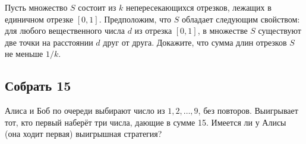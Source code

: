 Пусть множество $S$ состоит из $k$ непересекающихся отрезков, лежащих в единичном отрезке $[0,1]$.
Предположим, что $S$ обладает следующим свойством: для любого вещественного числа $d$ из отрезка $[0,1]$, в множестве $S$ существуют две точки на расстоянии $d$ друг от друга.
Докажите, что сумма длин отрезков $S$ не меньше $1/k$.

 
\subsection*{Собрать 15} %

Алиса и Боб по очереди выбирают число из $1, 2,\dots,9$, без повторов.
Выигрывает тот, кто первый наберёт три числа, дающие в сумме 15.
Имеется ли у Алисы (она ходит первая)
выигрышная стратегия?
